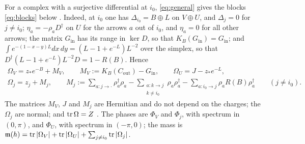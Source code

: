 For a complex with a surjective differential at $i_0$, \eqref{eq:general}
gives the blocks \eqref{eq:blocks} below \cite[Theorem~6.1(a)]{wue26c}.
Indeed, at $i_0$ one has $\Delta_{i_0}=B\oplus L$ on $V\oplus U$, and
$\Delta_j=0$ for $j\neq i_0$; $\eta_a=-\rho_aD^\dagger$ on $U$ for the arrows
$a$ out of $i_0$, and $\eta_a=0$ for all other arrows; the matrix
$G_{\mathrm{in}}$ has its range in $\ker D$, so that
$K_B(G_{\mathrm{in}})=G_{\mathrm{in}}$; and
$\int e^{-(1-x-y)L}dx\,dy=(L-1+e^{-L})L^{-2}$ over the simplex, so that
$D^\dagger(L-1+e^{-L})L^{-2}D=1-R(B)$. Hence
\begin{equation}\label{eq:blocks}
 \begin{gathered}
 \Omega_V=z_\ast e^{-B}+M_V,\qquad M_V:=K_B(C_{\mathrm{out}})-G_{\mathrm{in}},\qquad
 \Omega_U=J-z_\ast e^{-L},\\
 \Omega_j=z_j+M_j,\qquad
 M_j:=\sum_{a:j\to\cdot}\rho_a^\dagger\rho_a
 -\sum_{\substack{a:k\to j\\k\neq i_0}}\rho_a\rho_a^\dagger
 -\sum_{a:i_0\to j}\rho_aR(B)\rho_a^\dagger\qquad(j\neq i_0).
 \end{gathered}
\end{equation}
The matrices $M_V$, $J$ and $M_j$ are Hermitian and do not depend on the
charges; the $\Omega_j$ are normal; and $\operatorname{tr}\Omega=Z$
\cite[Lemma~5.17]{hkkp26}. The phases are $\Phi_V$ and $\Phi_j$, with
spectrum in $(0,\pi)$, and $\Phi_U$, with spectrum in $(-\pi,0)$; the mass is
$\mathfrak m(h)=\operatorname{tr}|\Omega_V|+\operatorname{tr}|\Omega_U|+\sum_{j\neq i_0}\operatorname{tr}|\Omega_j|$.

